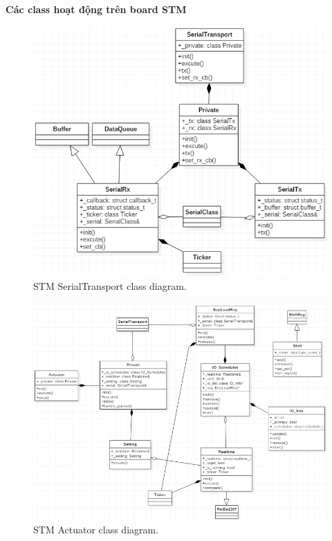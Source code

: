 \documentclass[a4paper,12pt,oneside]{article}
\begin{document}
\noindent \textbf{Các class hoạt động trên board STM}\\
\begin{figure}[H]
\centering
\begin{center}
\includegraphics[scale=.8]{hinh/class_serialtransport.PNG}
\end{center}
\caption{STM SerialTransport class diagram.}
\end{figure}

\begin{figure}[H]
\centering
\begin{center}
\includegraphics[scale=.7]{hinh/class_actuator.PNG}
\end{center}
\caption{STM Actuator class diagram.}
\end{figure}
\end{document}
